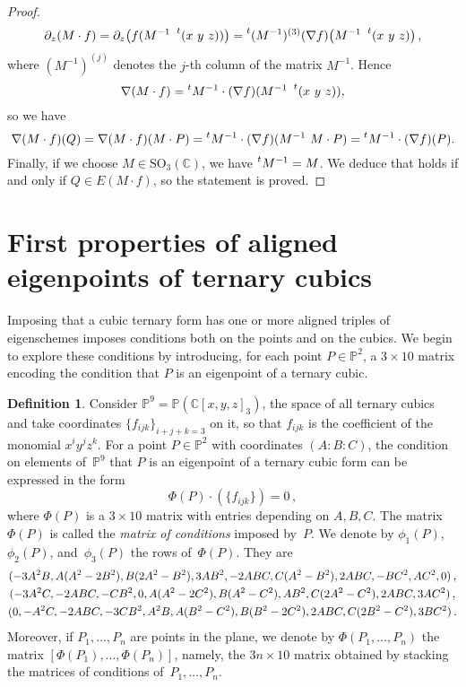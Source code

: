 \documentclass[12pt, a4paper, reqno, captions=tableheading,bibliography=totoc]{scrartcl}
\theoremstyle{plain}
\theoremstyle{definition}
\newtheorem{definition}[lemma]{Definition}
\newcommand{\C}{\mathbb{C}}
\newcommand{\p}{\mathbb{P}}
\newcommand\scalemath[2]{\scalebox{#1}{\mbox{\ensuremath{\displaystyle #2}}}}
\begin{document}
\begin{proof}
\begin{gather*}
\partial_z (M\cdot f) = \partial_z  \bigl( f(M^{-1}  \ \prescript{t} {} (x \ y \ z)) \bigr) = \prescript{t} {}(M^{-1})^{(3)}(\nabla f) \bigl( M^{-1}\   \prescript{t} {} (x \ y \ z) \bigr) \,,
\end{gather*}
where $(M^{-1})^{(j)}$ denotes the $j$-th column of the matrix $M^{-1}$. Hence
\[
\nabla (M \cdot f) = \prescript{t} {} M^{-1} \cdot (\nabla f) (M^{-1}\   \prescript{t} {} (x \ y \ z)),
\]
so we have
\[
\nabla (M \cdot f)(Q)=\nabla (M \cdot f)(M \cdot P)=
\prescript{t} {} M^{-1} \cdot (\nabla f) (M^{-1}\   M \cdot P)=\prescript{t} {} M^{-1} \cdot (\nabla f)(P).
\]
Finally, if we choose $M \in \mathrm{SO}_3(\mathbb{C})$, we have
$\prescript{t} {} M^{-1}=M$. We deduce that
 holds if and only if $Q \in E(M\cdot f)$, so the statement is proved.
\end{proof}

\section{First properties of aligned eigenpoints of ternary cubics}

Imposing that a cubic ternary form has one or more aligned triples of eigenschemes imposes conditions both on the points and on the cubics.
We begin to explore these conditions by introducing, for each point $P \in \p^2$,
a $3 \times 10$ matrix encoding the condition that $P$ is an eigenpoint of a ternary cubic.

\begin{definition}
\label{definition:matrix_conditions}
 Consider $\p^9 = \p(\C[x,y,z]_3)$, the space of all ternary cubics and take coordinates $\{ f_{ijk} \}_{i+j+k = 3}$ on it,
 so that $f_{ijk}$ is the coefficient of the monomial $x^i y^j z^k$.
 For a point $P \in \p^2$ with coordinates $(A: B: C)$, the condition on elements of~$\p^9$ that $P$ is an eigenpoint of a ternary cubic form can be expressed in the form
 \[
  \Phi(P) \cdot
  \left( \{ f_{ijk} \} \right)
  = 0 \,,
 \]
 where $\Phi(P)$ is a $3 \times 10$ matrix with entries depending on $A, B, C$.
 The matrix $\Phi(P)$ is called the \emph{matrix of conditions} imposed by~$P$.
We denote by $\phi_1(P)$, $\phi_2(P)$, and~$\phi_3(P)$ the rows of~$\Phi(P)$.
They are
%
\begin{gather*}
\scalemath{0.95}{(-3A^2B, A(A^2 - 2B^2), B(2A^2 - B^2), 3AB^2,
 -2ABC, C(A^2 - B^2), 2 ABC,
 -B  C^2, A  C^2, 0)} \,, \\
\scalemath{0.95}{(-3A^2 C,
-2ABC,
-CB^2,
0,
A(A^2-2C^2),
B(A^2 - C^2),
AB^2,
C(2A^2-C^2),
2ABC,
3AC^2)} \,,\\
\scalemath{0.95}{(0,
-A^2C,
-2ABC,
-3CB^2,
A^2 B,
A(B^2 - C^2),
B(B^2-2C^2),
2ABC,
C(2B^2-C^2),
3BC^2)} \,.
\end{gather*}
%
Moreover, if $P_1, \dotsc, P_n$ are points in the plane, we denote by $\Phi(P_1, \dotsc, P_n)$ the matrix $[\Phi(P_1), \dotsc, \Phi(P_n)]$, namely,
the $3n \times 10$ matrix obtained by stacking the matrices of conditions of~$P_1, \dotsc, P_n$.
\end{definition}
\end{document}
